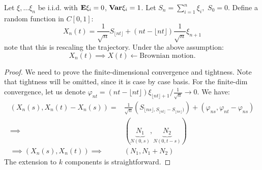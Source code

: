 \documentclass[../main/main.tex]{subfiles}
\begin{document}
\begin{theorem}
	Let $\xi, \ldots \xi_n$ be i.i.d. with $\text{\textbf{E}} \xi_i = 0$, $\text{\textbf{Var}} \xi_i = 1$. Let $S_n = \sum\limits_{i=1}^{n} \xi_i ,$ $S_0 = 0$. Define a random function in $C[0,1]$: \[
		X_n(t) = \frac{1}{\sqrt{n}}S_{\lfloor n t \rfloor} + (nt - \lfloor nt\rfloor) \frac{1}{\sqrt{n}}\xi_{n+1}
	\] note that this is rescaling the trajectory. Under the above assumption: \[
		X_n(t) \implies X(t) \leftarrow \text{Brownian motion}.
	\]
\end{theorem}
\begin{proof}
	We need to prove the finite-dimensional convergence and tightness. Note that tightness will be omitted, since it is case by case basis. For the finite-dim convergence, let us denote $\varphi_{n t} = (nt - \lfloor nt\rfloor) \xi_{\lfloor nt\rfloor + 1} / \frac{1}{\sqrt{n}} \to 0$. We have:
	\begin{align*}
		(X_n(s), X_n(t) - X_n(s))   =        & \frac{1}{\sqrt{n}}(S_{\lfloor ns\rfloor, S_{\lfloor nt\rfloor}-S_{\lfloor ns\rfloor})}) + (\varphi_{ns}, \varphi_{nt} - \varphi_{ns}) \\
		\implies                             & (\underbrace{N_1}_{N(0,s)}, \underbrace{N_2}_{N(0,t-s)})                                                                              \\
		\implies  (X_n(s), X_n(t))  \implies & (N_1, N_1 + N_2)
	\end{align*}
	The extension to $k$ components is straightforward.
\end{proof}
\end{document}
